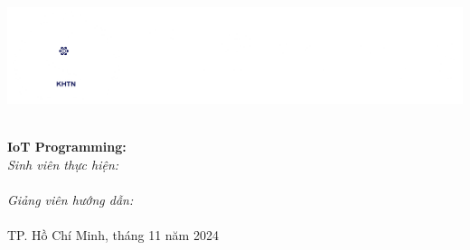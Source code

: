 \begin{titlepage}



\newcommand{\HRule}{\rule{\linewidth}{0.5mm}}

\includegraphics[scale=.15]{img/Logo-FIT.png}\\[1cm] 

{ 
\huge{\bfseries{\reporttitle}}\\[0.5cm]
\large{\bfseries{IoT Programming: \reportname}}
}\\[0.4cm]

\emph{Sinh viên thực hiện:}\\
\studentname\\[1cm]

\emph{Giảng viên hướng dẫn:} \\
\teachername\\[3cm]

{\large TP. Hồ Chí Minh, tháng 11 năm 2024}

\vfill


\end{titlepage}
	